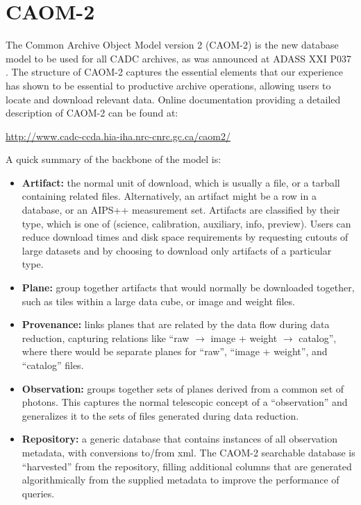 \section{CAOM-2}
The Common Archive Object Model version 2 (CAOM-2) is the new database model to be used for all CADC archives, as was announced at ADASS XXI P037 \citet{P037_adassxxi}.  The structure of CAOM-2 captures the essential elements that our experience has shown to be essential to productive archive operations, allowing users to locate and download relevant data.  Online documentation providing a detailed description of CAOM-2 can be found at:
\begin{center}
 \url{http://www.cadc-ccda.hia-iha.nrc-cnrc.gc.ca/caom2/}
 \end{center}  
A quick summary of the backbone of the model is:
\begin{itemize}
\item {\bf Artifact:} the normal unit of download, which is usually a file, or a tarball containing related files.  Alternatively, an artifact might be a row in a database, or an AIPS++ measurement set.  Artifacts are classified by their type, which is one of (science, calibration, auxiliary, info, preview).  Users can reduce download times and disk space requirements by requesting cutouts of large datasets and by choosing to download only artifacts of a particular type.
\item {\bf Plane:} group together artifacts that would normally be downloaded together, such as tiles within a large data cube, or image and weight files.
\item {\bf Provenance:} links planes that are related by the data flow during data reduction, capturing relations like ``raw $\rightarrow$ image + weight $\rightarrow$ catalog'', where there would be separate planes for ``raw'', ``image + weight'', and ``catalog'' files.
\item {\bf Observation:} groups together sets of planes derived from a common set of photons.  This captures the normal telescopic concept of a ``observation'' and generalizes it to the sets of files generated during data reduction.  
\item {\bf Repository:} a generic database that contains instances of all observation metadata, with conversions to/from xml.  The CAOM-2 searchable database is ``harvested'' from the repository, filling additional columns that are generated algorithmically from the supplied metadata to improve the performance of queries. 
\end{itemize}

